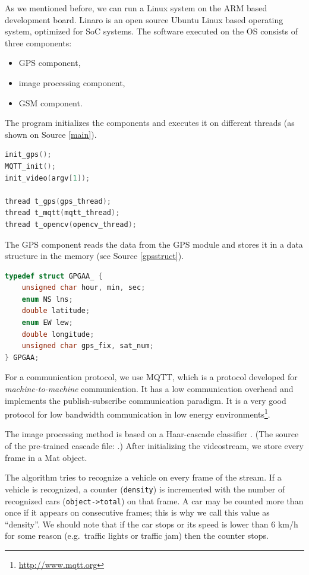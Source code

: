 \documentclass[b5paper,12pt]{report}
\theoremstyle{definition}
\begin{document}
As we mentioned before, we can run a Linux system on the ARM based development board. Linaro is an open source Ubuntu Linux based operating system, optimized for SoC systems. The software executed on the OS consists of three components:

\begin{itemize}
\item GPS component,
\item image processing component,
\item GSM component.
\end{itemize}

The program initializes the components and executes it on different threads (as shown on Source \ref{main}).

\begin{lstlisting}[language=C++,caption=Component initialization and execution., label=main]
init_gps();
MQTT_init();
init_video(argv[1]);

thread t_gps(gps_thread);
thread t_mqtt(mqtt_thread);
thread t_opencv(opencv_thread);
\end{lstlisting}

The GPS component reads the data from the GPS module and stores it in a data structure in the memory (see Source \ref{gpsstruct}).

\begin{lstlisting}[language=C++,caption=The data structure for timing and positioning., label=gpsstruct]
typedef struct GPGAA_ {
    unsigned char hour, min, sec;
    enum NS lns;
    double latitude;
    enum EW lew;
    double longitude;
    unsigned char gps_fix, sat_num;
} GPGAA;
\end{lstlisting}

For a communication protocol, we use MQTT, which is a protocol developed for \emph{machine-to-machine} communication. It has a low communication overhead and implements the publish-subscribe communication paradigm. It is a very good protocol for low bandwidth communication in low energy environments\footnote{\url{http://www.mqtt.org}}. 

The image processing method is based on a Haar-cascade classifier \cite{violacascade} \cite{haaremp}. (The source of the pre-trained cascade file: \cite{cascade}.) After initializing the videostream, we store every frame in a Mat object.

The algorithm tries to recognize a vehicle on every frame of the stream. If a vehicle is recognized, a counter (\texttt{density}) is incremented with the number of recognized cars ({\texttt{object->total}}) on that frame. A car may be counted more than once if it appears on consecutive frames; this is why we call this value as \enquote{density}. We should note that if the car stops or its speed is lower than 6 km/h for some reason (e.g.~traffic lights or traffic jam) then the counter stops. 
\end{document}
